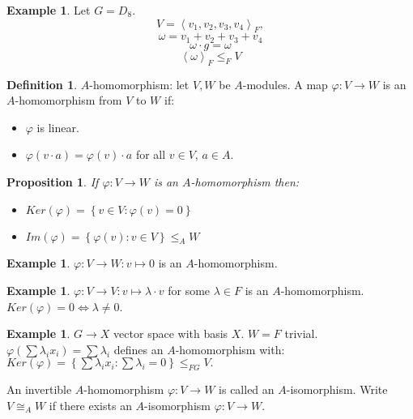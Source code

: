 \documentclass[12pt]{amsart}
\newtheorem{proposition}[theorem]{Proposition}
\theoremstyle{definition}
\newtheorem{example}[theorem]{Example}
\newtheorem{definition}[theorem]{Definition}
\begin{document}
\begin{example}
Let $G = D_{8}$. $$V = \left\langle v_{1}, v_{2}, v_{3}, v_{4} \right\rangle_{F},$$ $$\omega = v_{1} + v_{2} + v_{3} + v_{4}$$
$$\omega \cdot g = \omega$$
$$\left\langle \omega \right\rangle_{F} \leq_{F} V$$
\end{example}

\begin{definition}
$A$-homomorphism: let $V, W$ be $A$-modules. A map $\varphi: V \rightarrow W$ is an $A$-homomorphism from $V$ to $W$ if:
\begin{itemize}
\item $\varphi$ is linear.
\item $\varphi (v \cdot a) = \varphi ( v ) \cdot a$ for all $v \in V$, $a \in A$.
\end{itemize}
\end{definition}

\begin{proposition}
If $\varphi : V \rightarrow W$ is an $A$-homomorphism then:
\begin{itemize}
\item $Ker ( \varphi ) = \left\{ v \in V : \varphi ( v) = 0 \right\}$
\item $Im ( \varphi ) = \left\{ \varphi (v)  : v \in V \right\} \leq_{A} W$
\end{itemize}
\end{proposition}

\begin{example}
$\varphi: V \rightarrow W : v \mapsto 0$ is an $A$-homomorphism.
\end{example}

\begin{example}
$\varphi: V \rightarrow V: v \mapsto \lambda \cdot v$ for some $\lambda \in F$ is an $A$-homomorphism. $Ker ( \varphi ) = 0 \Leftrightarrow \lambda \neq 0$.
\end{example}

\begin{example}
$G \rightarrow X $ vector space with basis $X$. $W = F$ trivial. $\varphi ( \sum{\lambda_{i}}{x_{i}}) = \sum \lambda_{i}$ defines an $A$-homomorphism with: $Ker ( \varphi ) = \left\{ \sum \lambda_{i} x_{i} : \sum \lambda_{i} = 0 \right\} \leq_{FG} V.$
\end{example}

An invertible $A$-homomorphism $\varphi: V \rightarrow W$ is called an $A$-isomorphism. Write $V \cong_{A} W$ if there exists an $A$-isomorphism $\varphi: V \rightarrow W$.
\end{document}
